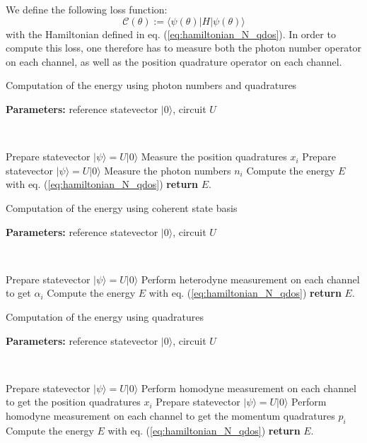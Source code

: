 \documentclass[reprint, amsmath, amssymb, aps]{revtex4-2}
\begin{document}
    We define the following loss function:
    \begin{equation}
        \mathcal C(\theta) := \langle\psi(\theta)|H|\psi(\theta)\rangle
    \end{equation}
    with the Hamiltonian defined in eq. (\ref{eq:hamiltonian_N_qdos}).
    In order to compute this loss, one therefore has to measure both the photon number operator on each channel, as well as the position quadrature operator on each channel.
    \newpage

    \begin{algorithm}
        \caption{Computation of the energy using photon numbers and quadratures}\label{alg:energy_computation}
            \textbf{Parameters:} reference statevector $|0\rangle$, circuit $U$

            \

            Prepare statevector $|\psi\rangle = U|0\rangle$\;
            Measure the position quadratures $x_i$\;
            Prepare statevector $|\psi\rangle = U|0\rangle$\;
            Measure the photon numbers $n_i$\;
            Compute the energy $E$ with eq. (\ref{eq:hamiltonian_N_qdos})\;
            \textbf{return} $E$.
    \end{algorithm}

    \begin{algorithm}
        \caption{Computation of the energy using coherent state basis}\label{alg:energy_computation_coherent_basis}
            \textbf{Parameters:} reference statevector $|0\rangle$, circuit $U$

            \

            Prepare statevector $|\psi\rangle = U|0\rangle$\;
            Perform heterodyne measurement on each channel to get $\alpha_i$\;
            Compute the energy $E$ with eq. (\ref{eq:hamiltonian_N_qdos})\;
            \textbf{return} $E$.
    \end{algorithm}

    \begin{algorithm}
        \caption{Computation of the energy using quadratures}
        \label{alg:energy_computation_quadratures}
            \textbf{Parameters:} reference statevector $|0\rangle$, circuit $U$

            \

            Prepare statevector $|\psi\rangle = U|0\rangle$\;
            Perform homodyne measurement on each channel to get the position quadratures $x_i$\;
            Prepare statevector $|\psi\rangle = U|0\rangle$\;
            Perform homodyne measurement on each channel to get the momentum quadratures $p_i$\;
            Compute the energy $E$ with eq. (\ref{eq:hamiltonian_N_qdos})\;
            \textbf{return} $E$.
    \end{algorithm}
\end{document}
